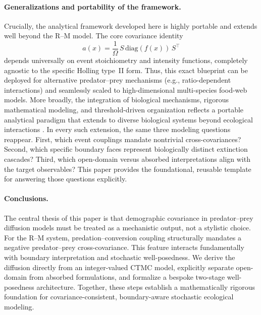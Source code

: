 \documentclass[pdflatex,sn-mathphys-ay]{sn-jnl}
\theoremstyle{thmstyleone}
\theoremstyle{definition}
\theoremstyle{remark}
\begin{document}
\paragraph{Generalizations and portability of the framework.}
Crucially, the analytical framework developed here is highly portable and extends well beyond the R--M model.
The core covariance identity
\[
a(x)=\frac{1}{\Omega}\,S\,\mathrm{diag}(f(x))\,S^\top
\]
depends universally on event stoichiometry and intensity functions, 
completely agnostic to the specific Holling type~II form.
Thus, this exact blueprint can be deployed for alternative predator--prey mechanisms (e.g., ratio-dependent interactions) and seamlessly scaled to high-dimensional multi-species food-web models.
More broadly, the integration of biological mechanisms, rigorous mathematical modeling, and threshold-driven organization reflects a portable analytical paradigm that extends to diverse biological systems beyond ecological interactions \citep{liang_global_2025,wang_damage-structured_2026}.
In every such extension, the same three modeling questions reappear.
First, which event couplings mandate nontrivial cross-covariances? 
Second, which specific boundary faces represent biologically distinct extinction cascades?
Third, which open-domain versus absorbed interpretations align with the target observables?
This paper provides the foundational, reusable template for answering those questions explicitly.

\paragraph{Conclusions.}
The central thesis of this paper is that demographic covariance in predator--prey diffusion models must be treated as a mechanistic output, not a stylistic choice.
For the R--M system, predation--conversion coupling structurally mandates a negative predator--prey cross-covariance.
This feature interacts fundamentally with boundary interpretation and stochastic well-posedness. 
We derive the diffusion directly from an integer-valued CTMC model, explicitly separate open-domain from absorbed formulations, and formalize a bespoke two-stage well-posedness architecture.
Together, these steps establish a mathematically rigorous foundation for covariance-consistent, boundary-aware stochastic ecological modeling.
\end{document}
